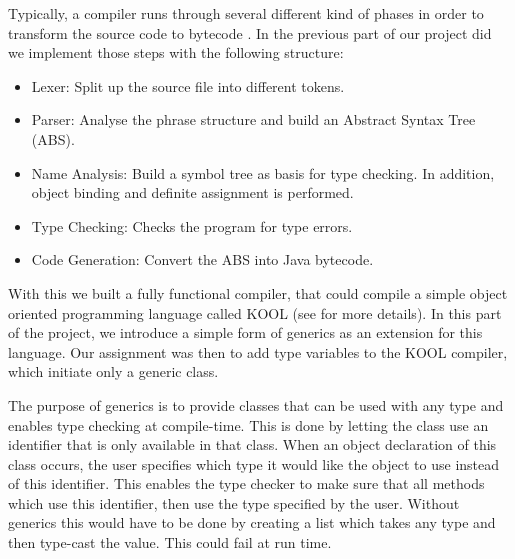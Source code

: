 Typically, a compiler runs through several different kind of phases in order to transform the source code to bytecode \cite[pp 12-15]{TigerBook:2002}. In the previous part of our project did we implement those steps with the following structure:

\begin{itemize}
	\item Lexer: Split up the source file into different tokens. 
	\item Parser: Analyse the phrase structure and build an Abstract Syntax Tree (ABS).
	\item Name Analysis: Build a symbol tree as basis for type checking. In addition, object binding and definite assignment is performed. 
	\item Type Checking: Checks the program for type errors.
	\item Code Generation: Convert the ABS into Java bytecode. 
\end{itemize}

With this we built a fully functional compiler, that could compile a simple object oriented programming language called KOOL (see \citep{Phaller:2015} for more details). 
In this part of the project, we introduce a simple form of generics as an extension for this language. Our assignment was then to add type variables to the KOOL compiler, which initiate only a generic class. 

The purpose of generics is to provide classes that can be used with any type and enables type checking at compile-time. This is done by letting the class use an identifier that is only available in that class. When an object declaration of this class occurs, the user specifies which type it would like the object to use instead of this identifier. This enables the type checker to make sure that all methods which use this identifier, then use the type specified by the user. Without generics this would have to be done by creating a list which takes any type and then type-cast the value. This could fail at run time.
